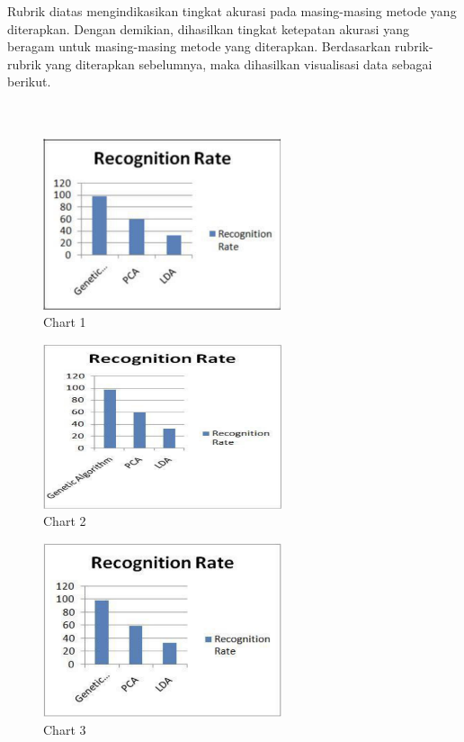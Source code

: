 \documentclass[conference]{IEEEtran}
\begin{document}
Rubrik diatas mengindikasikan tingkat akurasi pada masing-masing metode yang diterapkan. Dengan demikian, dihasilkan tingkat ketepatan akurasi yang beragam untuk masing-masing metode yang diterapkan. Berdasarkan rubrik-rubrik yang diterapkan sebelumnya, maka dihasilkan visualisasi data sebagai berikut.\\ \\ \\

\begin{figure}[htp]
    \centering
    \includegraphics[width=7cm]{images/CHA1.png}
    \caption{Chart 1}
    \label{fig:ORL}
\end{figure}

\begin{figure}[htp]
    \centering
    \includegraphics[width=7cm]{images/CHA2.png}
    \caption{Chart 2}
    \label{fig:UMIST}
\end{figure}

\begin{figure}[htp]
    \centering
    \includegraphics[width=7cm]{images/CHA3.png}
    \caption{Chart 3}
    \label{fig:INDBASE}
\end{figure}
\end{document}
